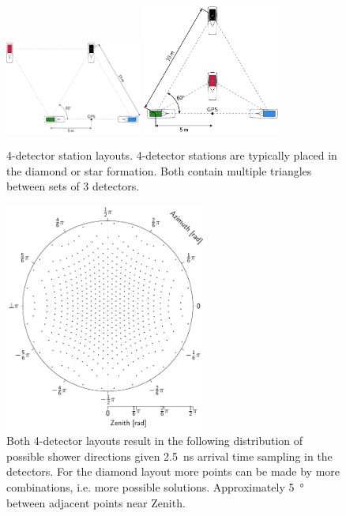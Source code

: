 \begin{figure}
    \centering
    \includegraphics[width=0.4\textwidth]
                    {plots/experiment/4_detector_diamond}
    \includegraphics[width=0.4\textwidth]
                    {plots/experiment/4_detector_star}
    \caption{4-detector station layouts. 4-detector stations are typically placed in the diamond or star formation. Both contain multiple triangles between sets of 3 detectors.}
    \label{fig:4_detector_layouts}
\end{figure}

\begin{figure}
    \centering
    \includegraphics[width=0.6\textwidth]
                    {plots/experiment/discrete_directions}
    \caption{Both 4-detector layouts result in the following distribution of possible shower directions given \SI{2.5}{\ns} arrival time sampling in the detectors. For the diamond layout more points can be made by more combinations, i.e. more possible solutions. Approximately \SI{5}{\degree} between adjacent points near Zenith.}
    \label{fig:discrete_directions}
\end{figure}

